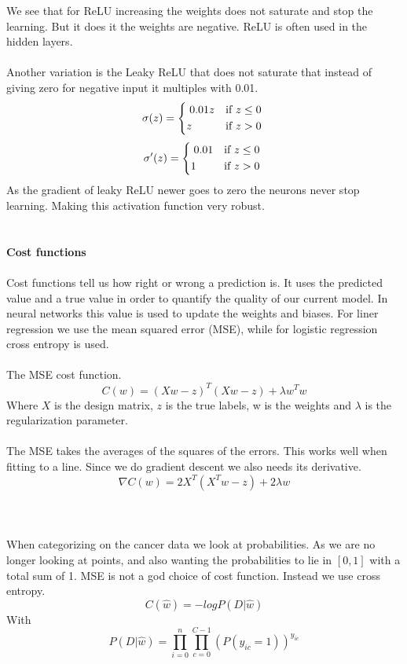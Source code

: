 \documentclass[12pt, letterpaper, twoside]{article}
\begin{document}
We see that for ReLU increasing the weights does not saturate and stop the learning. But it does it the weights are negative. ReLU is often used in the hidden layers.\\
\ \\
Another variation is the Leaky ReLU that does not saturate that instead of giving zero for negative input it multiples with 0.01.\\
\[
    \sigma(z) =
    \begin{dcases*}
  		\; 0.01z & if $z \leq 0 $ \\
  		z & if $z > 0$
	\end{dcases*}
\]
\[
    \sigma'(z) =
    \begin{dcases*}
  		\; 0.01 & if $z \leq 0 $ \\
  		1 & if $z > 0$
	\end{dcases*}
\]
As the gradient of leaky ReLU newer goes to zero the neurons never stop learning. Making this activation function very robust.\\
\ \\
\ \\
\textbf{Cost functions}\\
\ \\
Cost functions tell us how right or wrong a prediction is. It uses the predicted value and a true value in order to quantify the quality of our current model. 
In neural networks this value is used to update the weights and biases. For liner regression we use the mean squared error (MSE), while for logistic regression cross entropy is used.\\
\ \\
The MSE cost function.
$$
C(w) = (Xw - z)^T(Xw - z) + \lambda w^T w
$$
Where $X$ is the design matrix, $z$ is the true labels, w is the weights and $\lambda$ is the regularization parameter.\\
\ \\
The MSE takes the averages of the squares of the errors. This works well when fitting to a line. Since we do gradient descent we also needs its derivative.
$$
\nabla C(w) = 2 X^T (X^T w - z) + 2 \lambda w
$$\\
\ \\
\ \\
When categorizing on the cancer data we look at probabilities. As we are no longer looking at points, and also wanting the probabilities to lie in $[0,1]$ with a total sum of 1. MSE is not a god choice of cost function. Instead we use cross entropy.
$$
C(\hat{w}) = -log P(D|\hat{w})
$$  
With
$$
P(D|\hat{w}) = \prod_{i=0}^n \prod_{c=0}^{C-1}(P(y_{ic} = 1))^{y_{ic}}
$$
\end{document}
